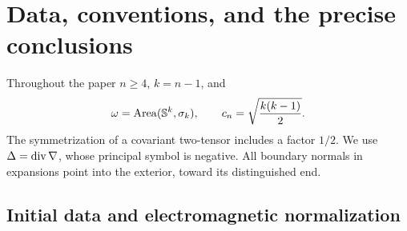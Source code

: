 \section{Data, conventions, and the precise conclusions}\label{sec:statements}

Throughout the paper $n\ge4$, $k=n-1$, and
\begin{equation}\label{eq:dimension-constants}
 \omega=\operatorname{Area}(\mathbb S^k,\sigma_k),\qquad
 c_n=\sqrt{\frac{k(k-1)}2}.
\end{equation}
The symmetrization of a covariant two-tensor includes a factor $1/2$.
We use $\Delta=\operatorname{div}\nabla$, whose principal symbol is negative.
All boundary normals in expansions point into the exterior, toward its distinguished end.

\subsection{Initial data and electromagnetic normalization}

